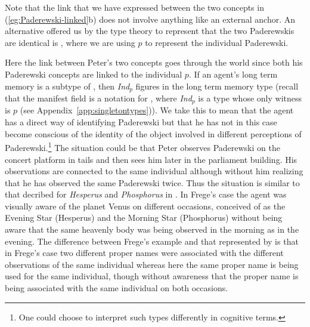 Note that the link that we have expressed between the two concepts in (\ref{eg:Paderewski-linked}b) 
does not involve anything like an external anchor. An alternative
offered us by the type theory to represent that the two Paderewskis
are identical is \nexteg{}, where we are using $p$ to represent the
individual Paderewski.
\begin{ex} 
\end{ex} 
Here the link between Peter's two concepts goes through the world
since both his Paderewski concepts are linked to the individual
$p$. If an agent's long term memory is a subtype of \preveg{}, then
\textit{Ind}$_p$ figures in the long term memory type (recall that the
manifest field  is a
notation for , where
\textit{Ind}$_p$ is a type whose only witness is $p$ (see
Appendix~\ref{app:singletontypes})).  We take this to mean that the
agent has a direct way of identifying Paderewski but that he has not
in this case become conscious of the identity of the object involved
in different perceptions of Paderewski.\footnote{One could choose to
  interpret such types differently in cognitive terms.}  The situation
could be that Peter observes Paderewski on the concert platform in
tails and then sees him later in the parliament building.  His
observations are connected to the same individual although without him
realizing that he has observed the same Paderewski twice.  Thus the
situation is similar to that decribed for \textit{Hesperus} and
\textit{Phosphorus} in \cite{Frege1892}.  In Frege's case the agent
was visually aware of the planet Venus on different occasions, conceived of as the Evening
Star (Hesperus) and the Morning Star (Phosphorus) without being aware
that the same heavenly body was being observed in the morning as in
the evening.  The difference between Frege's example and that
represented by \preveg{} is that in Frege's case two different proper
names were associated with the different observations of the same
individual whereas here the same proper name is being used for the
same individual, though without awareness that the proper name is
being associated with the same individual on both occasions.    

